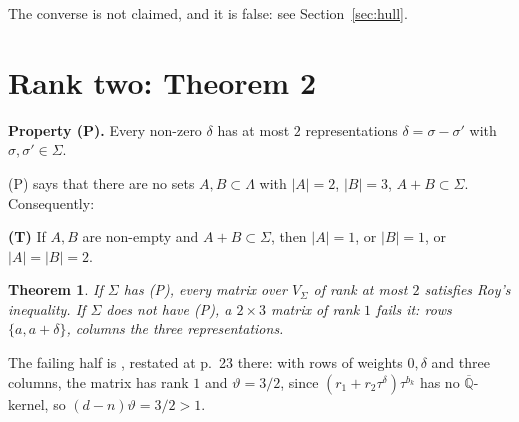\documentclass[11pt,a4paper]{article}
\theoremstyle{plain}
\newtheorem{theorem}{Theorem}
\theoremstyle{definition}
\newcommand{\Qbar}{\overline{\mathbb{Q}}}
\newcommand{\vth}{\vartheta}
\begin{document}
The converse is not claimed, and it is false: see Section~\ref{sec:hull}.

\section{Rank two: Theorem 2}\label{sec:ranktwo}

\textbf{Property (P).} Every non-zero $\delta$ has at most $2$ representations $\delta=\sigma-\sigma'$ with $\sigma,\sigma'\in\Sigma$.

(P) says that there are no sets $A,B\subset\Lambda$ with $|A|=2$, $|B|=3$, $A+B\subset\Sigma$. Consequently:

\textbf{(T)} If $A,B$ are non-empty and $A+B\subset\Sigma$, then $|A|=1$, or $|B|=1$, or $|A|=|B|=2$.

\begin{theorem}\label{thm:ranktwo}
If $\Sigma$ has \textup{(P)}, every matrix over $V_{\Sigma}$ of rank at most $2$ satisfies Roy's inequality. If $\Sigma$ does not have \textup{(P)}, a $2\times3$ matrix of rank $1$ fails it: rows $\{a,a+\delta\}$, columns the three representations.
\end{theorem}

The failing half is \cite[Cor.~2, p.~38]{Roy92}, restated at p.~23 there: with rows of weights $0,\delta$ and three columns, the matrix has rank $1$ and $\vth=3/2$, since $(r_{1}+r_{2}\tau^{\delta})\tau^{b_{k}}$ has no $\Qbar$-kernel, so $(d-n)\vth=3/2>1$.
\end{document}
